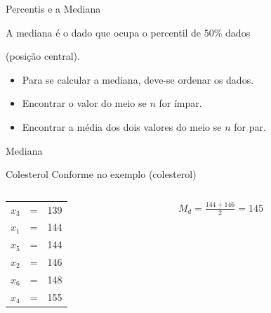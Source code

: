 \documentclass{beamer}
\begin{document}
\begin{frame}{\scriptsize Percentis e a Mediana}
  \begin{block}{}
    \footnotesize
    A mediana é o dado que ocupa o percentil de 50\% dados

    (\alert{posição central}).
  \end{block}
  \bigskip
  \begin{itemize}
    \footnotesize
  \item Para se calcular a mediana, deve-se ordenar os dados.
  \item Encontrar o valor do \alert{meio} se $n$ for ímpar.
  \item Encontrar a média dos dois valores do \alert{meio} se $n$ for par.
  \end{itemize}
\end{frame}

\begin{frame}{\scriptsize Mediana}
  \begin{exampleblock}{Colesterol}
    \footnotesize
    Conforme no exemplo (colesterol)
    \bigskip
    \tiny
    \begin{columns}
      \begin{column}{5cm}
        \begin{tabular}{ccc}
          $x_3$ &=&139\\
          $x_1$ &=&144\\
          $x_5$ &=&\alert{144}\\
          $x_2$ &=&\alert{146}\\
          $x_6$ &=&148\\
          $x_4$ &=&155\\
        \end{tabular}
      \end{column}
      \begin{column}{5cm}
        \scriptsize
        $M_d = \frac{144+146}{2}=145$
      \end{column}
    \end{columns}
  \end{exampleblock}
\end{frame}
\end{document}
